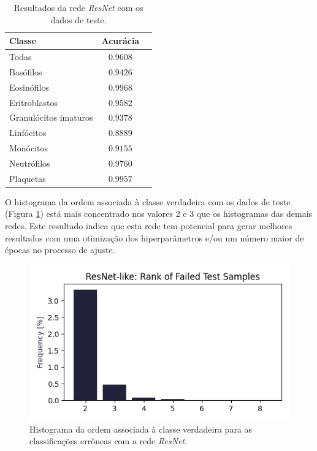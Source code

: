 \documentclass[final,5p]{elsarticle}
\numberwithin{equation}{section}
\begin{document}
    \begin{table}[h]
        \centering
        \begin{tabular}{l c c}
            \toprule
            \textbf{Classe} & \textbf{Acurácia} \\
            \midrule
            Todas & $0.9608$ \\
            \addlinespace
            Basófilos  & $0.9426$ \\
            Eosinófilos  & $0.9968$ \\
            Eritroblastos  & $0.9582$ \\
            Granulócitos imaturos  & $0.9378$ \\
            Linfócitos  & $0.8889$ \\
            Monócitos  & $0.9155$ \\
            Neutrófilos  & $0.9760$ \\
            Plaquetas  & $0.9957$ \\
            \bottomrule
        \end{tabular}
        \caption{Resultados da rede \emph{ResNet} com os dados de teste.}\label{tab:ResultadosResNet}
    \end{table}

    O histograma da ordem associada à classe verdadeira com os dados de teste (Figura \ref{fig:HistogramaErrosResNet}) está mais concentrado nos valores 2 e 3 que os histogramas das demais redes. Este resultado indica que esta rede tem potencial para gerar melhores resultados com uma otimização dos hiperparâmetros e/ou um número maior de épocas no processo de ajuste.

    \begin{figure}[hbt!]
        \includegraphics[width=0.95\columnwidth]{ResNet_rank.png}
        \caption{Histograma da ordem associada à classe verdadeira para as classificações errôneas com a rede \emph{ResNet}.}\label{fig:HistogramaErrosResNet}
    \end{figure}
\end{document}
